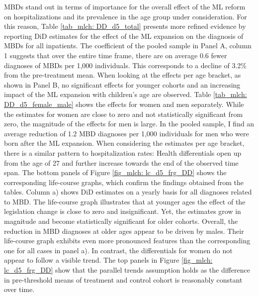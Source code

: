 MBDs stand out in terms of importance for the overall effect of the ML reform on hospitalizations and its prevalence in the age group under consideration. For this reason, Table \ref{tab_mlch: DD_d5_total} presents more refined evidence by reporting DiD estimates for the effect of the ML expansion on the diagnosis of MBDs for all inpatients. The coefficient of the pooled sample in Panel A, column 1 suggests that over the entire time frame, there are on average 0.6 fewer diagnoses of MBDs per 1,000 individuals. This corresponds to a decline of 3.2\% from the pre-treatment mean. When looking at the effects per age bracket, as shown in Panel B, no significant effects for younger cohorts and an increasing impact of the ML expansion with children's age are observed. Table \ref{tab_mlch: DD_d5_female_male} shows the effects for women and men separately. While the estimates for women are close to zero and not statistically significant from zero, the magnitude of the effects for men is large. In the pooled sample, I find an average reduction of 1.2 MBD diagnoses per 1,000 individuals for men who were born after the ML expansion. When considering the estimates per age bracket, there is a similar pattern to hospitalization rates: Health differentials open up from the age of 27 and further increase towards the end of the observed time span. The bottom panels of Figure \ref{fig_mlch: lc_d5_frg_DD} shows the corresponding life-course graphs, which confirm the findings obtained from the tables. Column a) shows DiD estimates on a yearly basis for all diagnoses related to MBD. The life-course graph illustrates that at younger ages the effect of the legislation change is close to zero and insignificant. Yet, the estimates grow in magnitude and become statistically significant for older cohorts. Overall, the reduction in MBD diagnoses at older ages appear to be driven by males. Their life-course graph exhibits even more pronounced features than the corresponding one for all cases in panel a). In contrast, the differentials for women do not appear to follow a visible trend. The top panels in Figure \ref{fig_mlch: lc_d5_frg_DD} show that the parallel trends assumption holds as the difference in pre-threshold means of treatment and control cohort is reasonably constant over time.

